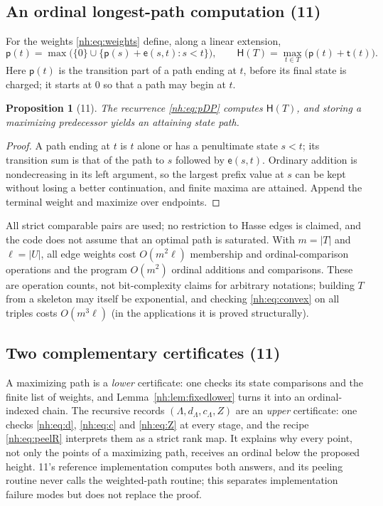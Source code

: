 \documentclass[11pt,a4paper]{article}
\newtheorem{proposition}[theorem]{Proposition}
\theoremstyle{definition}
\theoremstyle{remark}
\newcommand{\ew}{\mathsf e}
\newcommand{\tw}{\mathsf t}
\newcommand{\HH}{\mathsf H}
\begin{document}
\subsection{An ordinal longest-path computation (11)}

For the weights \eqref{nh:eq:weights} define, along a linear extension,
\begin{equation}\label{nh:eq:pDP}
 \mathsf p(t)=\max\bigl(\{0\}\cup\{\mathsf p(s)+\ew(s,t):s<t\}\bigr),
 \qquad
 \HH(T)=\max_{t\in T}\bigl(\mathsf p(t)+\tw(t)\bigr).
\end{equation}
Here $\mathsf p(t)$ is the transition part of a path ending at $t$, before its
final state is charged; it starts at $0$ so that a path may begin at $t$.

\begin{proposition}[11]\label{nh:prop:pDP}
The recurrence \eqref{nh:eq:pDP} computes $\HH(T)$, and storing a maximizing
predecessor yields an attaining state path.
\end{proposition}
\begin{proof}
A path ending at $t$ is $t$ alone or has a penultimate state $s<t$; its
transition sum is that of the path to $s$ followed by $\ew(s,t)$. Ordinary
addition is nondecreasing in its left argument, so the largest prefix value
at $s$ can be kept without losing a better continuation, and finite maxima
are attained. Append the terminal weight and maximize over endpoints.
\end{proof}

All strict comparable pairs are used; no restriction to Hasse edges is
claimed, and the code does not assume that an optimal path is saturated. With
$m=|T|$ and $\ell=|U|$, all edge weights cost $O(m^2\ell)$ membership and
ordinal-comparison operations and the program $O(m^2)$ ordinal additions and
comparisons. These are operation counts, not bit-complexity claims for
arbitrary notations; building $T$ from a skeleton may itself be exponential,
and checking \eqref{nh:eq:convex} on all triples costs $O(m^3\ell)$ (in the
applications it is proved structurally).

\subsection{Two complementary certificates (11)}

A maximizing path is a \emph{lower} certificate: one checks its state
comparisons and the finite list of weights, and
Lemma~\ref{nh:lem:fixedlower} turns it into an ordinal-indexed chain. The
recursive records $(\Lambda,d_\Lambda,c_\Lambda,Z)$ are an \emph{upper}
certificate: one checks \eqref{nh:eq:d}, \eqref{nh:eq:c} and \eqref{nh:eq:Z}
at every stage, and the recipe \eqref{nh:eq:peelR} interprets them as a
strict rank map. It explains why every point, not only the points of a
maximizing path, receives an ordinal below the proposed height. 11's
reference implementation computes both answers, and its peeling routine never
calls the weighted-path routine; this separates implementation failure modes
but does not replace the proof.
\end{document}
